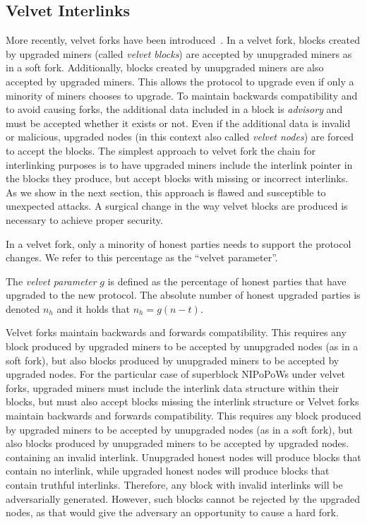 \subsection{Velvet Interlinks}
More recently, velvet forks have been introduced~\cite{velvet}. In a
velvet fork, blocks created by upgraded miners (called \emph{velvet blocks}) are
accepted by unupgraded miners as in a soft fork. Additionally, blocks created by
unupgraded miners are also accepted by upgraded miners. This allows the protocol
to upgrade even if only a minority of miners chooses to upgrade. To maintain
backwards compatibility and to avoid causing forks, the additional data included
in a block is \emph{advisory} and must be accepted whether it exists or not.
Even if the additional data is invalid or malicious, upgraded nodes (in this
context also called \emph{velvet nodes}) are forced to accept the blocks. The
simplest approach to velvet fork the chain for interlinking purposes is to have
upgraded miners include the interlink pointer in the blocks they produce, but
accept blocks with missing or incorrect interlinks. As we show in the next
section, this approach is flawed and susceptible to unexpected attacks. A
surgical change in the way velvet blocks are produced is necessary to achieve
proper security.

In a velvet fork, only a minority of honest parties needs to support the protocol
changes. We refer to this percentage as the ``velvet parameter''.

\begin{definition}
	The \emph{velvet parameter} $g$ is defined as the percentage of honest parties
	that have upgraded to the new protocol. The absolute number of honest upgraded
	parties is denoted $n_h$ and it holds that
	$n_h = g (n - t)$.
	\label{defn:velvet_honest_majority}
\end{definition}

Velvet forks maintain backwards and forwards compatibility. This requires any
block produced by upgraded miners to be accepted by unupgraded nodes (as in a
soft fork), but also blocks produced by unupgraded miners to be accepted by
upgraded nodes. For the particular case of superblock NIPoPoWs under velvet
forks, upgraded miners must include the interlink data structure within their
blocks, but must also accept blocks missing the interlink structure or
Velvet forks maintain backwards and forwards compatibility. This requires any
block produced by upgraded miners to be accepted by unupgraded nodes (as in a
soft fork), but also blocks produced by unupgraded miners to be accepted by
upgraded nodes.
containing an invalid interlink. Unupgraded honest nodes will produce blocks
that contain no interlink, while upgraded honest nodes will produce blocks that
contain truthful interlinks. Therefore, any block with invalid interlinks will
be adversarially generated. However, such blocks cannot be rejected by the
upgraded nodes, as that would give the adversary an opportunity to cause a hard
fork.

